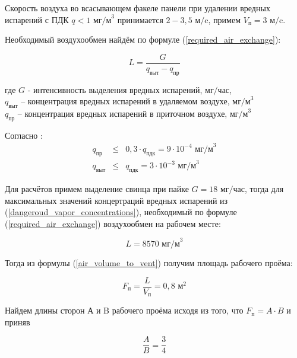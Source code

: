 Скорость воздуха во всасывающем факеле панели при удалении вредных испарений с
ПДК $q < 1$ $\text{мг/м}^3$ \cite[табл. 1.1]{local_vent_spot_calc_method} принимается
$2 - 3,5 \text{ м/c}$, примем $V_\text{п} = 3 \text{ м/c}$.

Необходимый воздухообмен найдём по формуле (\ref{required_air_exchange}):

\begin{equation}
\label{required_air_exchange}
    L = \frac{G}{q_\text{выт} - q_\text{пр}}
\end{equation}

где $G$ - интенсивность выделения вредных испарений, $\text{мг/час}$,                   \\
$q_\text{выт}$ – концентрация вредных испарений в удаляемом воздухе, $\text{мг/м}^3$    \\
$q_\text{пр}$ – концентрация вредных испарений в приточном воздухе, $\text{мг/м}^3$

Согласно \cite[п. 2.15]{ecology_san_norm_245_71}:
\begin{equation}
\label{dangeroud_vapor_concentrations}
    \begin{array}{lcr}
        q_\text{пр}  & \leq & 0,3 \cdot q_\text{пдк} = 9 \cdot 10^{-4} \text{ мг/м}^3 \\
        q_\text{выт} & \leq &           q_\text{пдк} = 3 \cdot 10^{-3} \text{ мг/м}^3
    \end{array}
\end{equation}

Для расчётов примем выделение свинца при пайке $G = 18 \text{ мг/час}$,
тогда для максимальных значений концертраций вредных испарений из
(\ref{dangeroud_vapor_concentrations}), необходимый по формуле (\ref{required_air_exchange})
воздухообмен на рабочем месте:

$$
    L = 8570 \text{ мг/м}^3
$$

Тогда из формулы (\ref{air_volume_to_vent}) получим площадь рабочего проёма:

\begin{equation}
\label{working_window_area}
    F_\text{п} = \frac{L}{V_\text{п}} = 0,8 \text{ м}^2
\end{equation}

Найдем длины сторон А и B рабочего проёма исходя из того, что $F_\text{п}  = A \cdot B$ и приняв

\begin{equation}
\label{working_window_area_sides_ratio}
    \frac{A}{B} = \frac{3}{4}
\end{equation}

